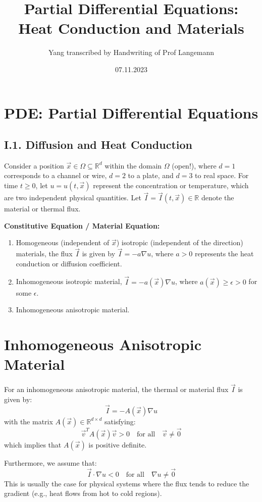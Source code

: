 \documentclass[11pt]{article}
\title{Partial Differential Equations: \\ Heat Conduction and Materials}
\author{Yang transcribed by Handwriting of Prof Langemann}
\date{07.11.2023}
\begin{document}
\maketitle

\section*{PDE: Partial Differential Equations}

\subsection*{I.1. Diffusion and Heat Conduction}
Consider a position \( \vec{x} \in \Omega \subseteq \mathbb{R}^d \) within the domain \( \Omega \) (open!),
where \( d=1 \) corresponds to a channel or wire, \( d=2 \) to a plate, and \( d=3 \) to real space.
For time \( t \geq 0 \), let \( u = u(t, \vec{x}) \) represent the concentration or temperature, which are two independent physical quantities.
Let \( \vec{I} = \vec{I}(t,\vec{x}) \in \mathbb{R} \) denote the material or thermal flux.

\textbf{Constitutive Equation / Material Equation:}
\begin{enumerate}
\item Homogeneous (independent of \( \vec{x} \)) isotropic (independent of the direction) materials, the flux \( \vec{I} \) is given by \( \vec{I} = -a \nabla u \), where \( a > 0 \) represents the heat conduction or diffusion coefficient.
\item Inhomogeneous isotropic material, \( \vec{I} = -a(\vec{x}) \nabla u \), where \( a(\vec{x}) \geq \epsilon > 0 \) for some \( \epsilon \).
\item Inhomogeneous anisotropic material.
\end{enumerate}



\section*{Inhomogeneous Anisotropic Material}

For an inhomogeneous anisotropic material, the thermal or material flux \( \vec{I} \) is given by:
\[ \vec{I} = -A(\vec{x}) \nabla u \]
with the matrix \( A(\vec{x}) \in \mathbb{R}^{d \times d} \) satisfying:
\[ \vec{v}^T A(\vec{x}) \vec{v} > 0 \quad \text{for all} \quad \vec{v} \neq \vec{0} \]
which implies that \( A(\vec{x}) \) is positive definite.

Furthermore, we assume that:
\[ \vec{I} \cdot \nabla u < 0 \quad \text{for all} \quad \nabla u \neq \vec{0} \]
This is usually the case for physical systems where the flux tends to reduce the gradient (e.g., heat flows from hot to cold regions).
\end{document}
